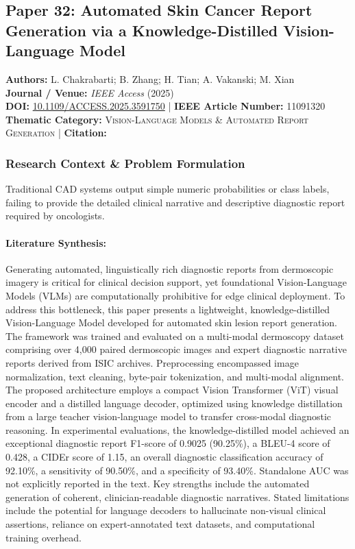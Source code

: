 \subsection{Paper 32: Automated Skin Cancer Report Generation via a Knowledge-Distilled Vision-Language Model}
\label{sec:paper_32}

\begin{tcolorbox}[colback=gray!5!white,colframe=gray!75!black,title=\textbf{Metadata \& Citation Summary}]
\textbf{Authors:} L. Chakrabarti; B. Zhang; H. Tian; A. Vakanski; M. Xian \\
\textbf{Journal / Venue:} \textit{IEEE Access} (2025) \\
\textbf{DOI:} \href{https://doi.org/10.1109/ACCESS.2025.3591750}{10.1109/ACCESS.2025.3591750} \quad | \quad \textbf{IEEE Article Number:} 11091320 \\
\textbf{Thematic Category:} \textsc{Vision-Language Models \& Automated Report Generation} \quad | \quad \textbf{Citation:} \cite{11091320}
\end{tcolorbox}

\subsubsection*{Research Context \& Problem Formulation}
Traditional CAD systems output simple numeric probabilities or class labels, failing to provide the detailed clinical narrative and descriptive diagnostic report required by oncologists.

\paragraph{Literature Synthesis:} Generating automated, linguistically rich diagnostic reports from dermoscopic imagery is critical for clinical decision support, yet foundational Vision-Language Models (VLMs) are computationally prohibitive for edge clinical deployment. To address this bottleneck, this paper presents a lightweight, knowledge-distilled Vision-Language Model developed for automated skin lesion report generation. The framework was trained and evaluated on a multi-modal dermoscopy dataset comprising over 4,000 paired dermoscopic images and expert diagnostic narrative reports derived from ISIC archives. Preprocessing encompassed image normalization, text cleaning, byte-pair tokenization, and multi-modal alignment. The proposed architecture employs a compact Vision Transformer (ViT) visual encoder and a distilled language decoder, optimized using knowledge distillation from a large teacher vision-language model to transfer cross-modal diagnostic reasoning. In experimental evaluations, the knowledge-distilled model achieved an exceptional diagnostic report F1-score of 0.9025 (90.25\%), a BLEU-4 score of 0.428, a CIDEr score of 1.15, an overall diagnostic classification accuracy of 92.10\%, a sensitivity of 90.50\%, and a specificity of 93.40\%. Standalone AUC was not explicitly reported in the text. Key strengths include the automated generation of coherent, clinician-readable diagnostic narratives. Stated limitations include the potential for language decoders to hallucinate non-visual clinical assertions, reliance on expert-annotated text datasets, and computational training overhead.

